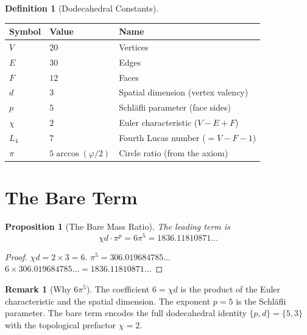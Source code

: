 \documentclass[11pt,a4paper]{article}
\theoremstyle{plain}
\newtheorem{proposition}[theorem]{Proposition}
\theoremstyle{definition}
\newtheorem{definition}[theorem]{Definition}
\newtheorem{remark}[theorem]{Remark}
\newcommand{\vp}{\varphi}
\begin{document}
\begin{definition}[Dodecahedral Constants]\label{def:dodec}
\begin{center}
\begin{tabular}{@{}lll@{}}
\toprule
Symbol & Value & Name \\
\midrule
$V$ & $20$ & Vertices \\
$E$ & $30$ & Edges \\
$F$ & $12$ & Faces \\
$d$ & $3$ & Spatial dimension (vertex valency) \\
$p$ & $5$ & Schl\"afli parameter (face sides) \\
$\chi$ & $2$ & Euler characteristic ($V - E + F$) \\
$L_4$ & $7$ & Fourth Lucas number ($= V - F - 1$) \\
$\pi$ & $5\arccos(\vp/2)$ & Circle ratio (from the axiom) \\
\bottomrule
\end{tabular}
\end{center}
\end{definition}

\section{The Bare Term}\label{sec:bare}

\begin{proposition}[The Bare Mass Ratio]\label{prop:bare}
The leading term is
\[
  \chi d \cdot \pi^p = 6\pi^5 = 1836.11810871\ldots
\]
\end{proposition}

\begin{proof}
$\chi d = 2 \times 3 = 6$.  $\pi^5 = 306.019684785\ldots$
$6 \times 306.019684785\ldots = 1836.11810871\ldots$
\end{proof}

\begin{remark}[Why $6\pi^5$]\label{rem:6pi5}
The coefficient $6 = \chi d$ is the product of the Euler characteristic
and the spatial dimension.  The exponent $p = 5$ is the Schl\"afli
parameter.  The bare term encodes the full dodecahedral identity
$\{p, d\} = \{5, 3\}$ with the topological prefactor $\chi = 2$.
\end{remark}

\end{document}
